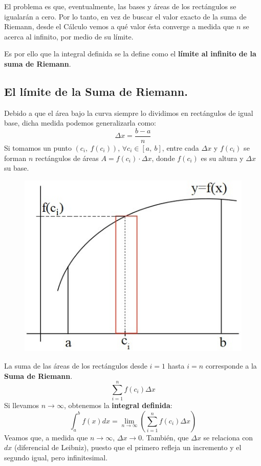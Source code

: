 \documentclass[12pt]{article}
\begin{document}
El problema es que, eventualmente, las bases y áreas de los rectángulos se igualarán a cero. Por lo tanto, en vez de buscar el valor exacto de la suma de Riemann, desde el Cálculo vemos a qué valor ésta converge a medida que $n$ se acerca al infinito, por medio de su límite.

Es por ello que la integral definida se la define como el \textbf{límite al infinito de la suma de Riemann}.

\subsection{El límite de la Suma de Riemann.}

Debido a que el área bajo la curva siempre lo dividimos en rectángulos de igual base, dicha medida podemos generalizarla como:
\[
  \Delta x = \frac{b - a}{n}
\]
Si tomamos un punto $(c_{i}, \ f(c_{i}))$, $\forall c_{i} \in [a, \ b]$, entre cada $\Delta x$ y $f(c_{i})$ se forman $n$ rectángulos de áreas $A = f(c_{i}) \cdot \Delta x$, donde $f(c_{i})$ es su altura y $\Delta x$ su base.

\begin{figure}[hbt!]
\centering
\includegraphics[scale=0.45]{img/riemann-sum.jpg}
\end{figure}

La suma de las áreas de los rectángulos desde $i = 1$ hasta $i = n$ corresponde a la \textbf{Suma de Riemann}.
\[
  \sum_{i = 1}^{n} f(c_{i}) \Delta x
\]
Si llevamos $n \to \infty$, obtenemos la \textbf{integral definida}:
\[
  \int_{a}^{b} f(x)dx = \lim_{n \to \infty} \left(\sum_{i = 1}^{n} f(c_{i}) \Delta x\right)
\]
Veamos que, a medida que $n \to \infty$, $\Delta x \to 0$. También, que $\Delta x$ se relaciona con $dx$ (diferencial de Leibniz), puesto que el primero refleja un incremento y el segundo igual, pero infinitesimal.
\end{document}
